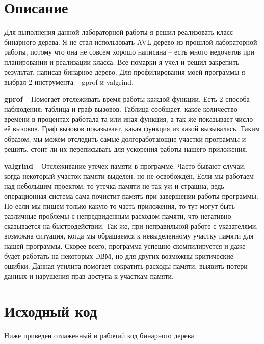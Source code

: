 \section{Описание}
Для выполнения данной лабораторной работы я решил реализовать класс бинарного дерева. Я не стал использовать AVL-дерево из прошлой лабораторной работы, потому что она не совсем хорошо написана -- есть много недочетов при планировании и реализации класса. Все помарки я учел и решил закрепить результат, написав бинарное дерево. Для профилирования моей программы я выбрал 2 инструмента -- gprof и valgrind.

\textbf{gprof} -- Помогает отслеживать время работы каждой функции. Есть 2 способа наблюдения: таблица и граф вызовов. Таблица сообщает, какое количество времени в процентах работала та или иная функция, а так же показывает число её вызовов. Граф вызовов показывает, какая функция из какой вызывалась. Таким образом, мы можем отследить самые долгоработающие участки программы и решить, стоит ли их переписывать для ускорения работы нашего приложения.

\textbf{valgrind} -- Отслеживание утечек памяти в программе. Часто бывают случаи, когда некоторый участок памяти выделен, но не освобождён. Если мы работаем над небольшим проектом, то утечка памяти не так уж и страшна, ведь операционная система сама почистит память при завершении работы программы. Но если мы пишем только какую-то часть приложения, то тут могут быть различные проблемы с непредвиденным расходом памяти, что негативно сказывается на быстродействии. Так же, при неправильной работе с указателями, возможна ситуация, когда мы обращаемся к невыделенному участку памяти для нашей программы. Скорее всего, программа успешно скомпилируется и даже будет работать на некоторых ЭВМ, но для других возможны критические ошибки. Данная утилита помогает сократить расходы памяти, выявить потери данных и нарушения прав доступа к участкам памяти.

\pagebreak

\section{Исходный код}
Ниже приведен отлаженный и рабочий код бинарного дерева.

